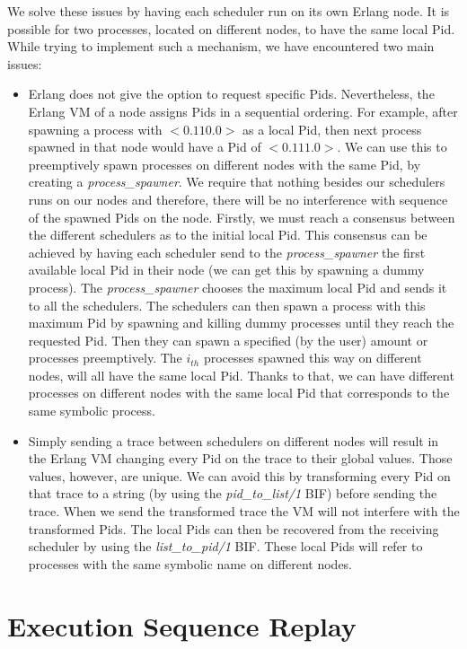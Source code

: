 We solve these issues by having each scheduler run on its own Erlang node. It is possible for two processes, located on different nodes,
to have the same local Pid. While trying to implement such a mechanism, we have encountered two main issues:
\begin{itemize}
    \item Erlang does not give the option to request specific Pids. Nevertheless, the Erlang VM of a node assigns Pids in a sequential ordering. For example,
    after spawning a process with $<0.110.0>$ as a local Pid, then next process spawned in that node would have a Pid of $<0.111.0>$. We can use this
    to preemptively spawn processes on different nodes with the same Pid, by creating a \textit{process\_spawner}.
    We require that nothing besides our schedulers runs on our nodes
    and therefore, there will be no interference with sequence of the spawned Pids on the node. Firstly, we must reach a consensus between the different
    schedulers as to the initial local Pid. This consensus can be achieved by having each scheduler send to the \textit{process\_spawner} the first available
    local Pid in their node (we can get this by spawning a dummy process). The \textit{process\_spawner} chooses the maximum local Pid and sends it to all the schedulers.
    The schedulers can then spawn a process with this maximum Pid by spawning and killing dummy processes until they reach the requested Pid. Then they can
    spawn a specified (by the user) amount or processes preemptively. The $i_{th}$ processes spawned this way on different nodes, will all have the same local Pid.
    Thanks to that, we can have different processes on different nodes with the same local Pid that corresponds to the same symbolic process. 
    \item Simply sending a trace between schedulers on different nodes will result in the Erlang VM changing every Pid on the trace to their global values.
    Those values, however, are unique. We can avoid this by transforming every Pid on that trace to a string (by using the \textit{pid\_to\_list/1} BIF) before
    sending the trace. When we send the transformed trace the VM will not interfere with the transformed Pids. The local Pids can then be recovered from
    the receiving scheduler by using the \textit{list\_to\_pid/1} BIF. These local Pids will refer to processes with the same symbolic name on different nodes. 
\end{itemize}

\section{Execution Sequence Replay}

